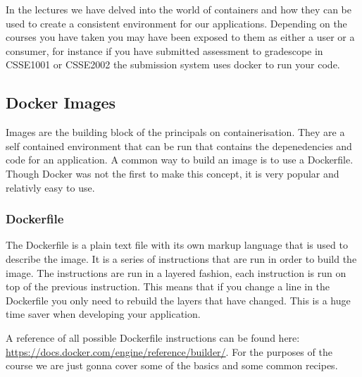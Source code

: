 \documentclass{csse4400}
\begin{document}
In the lectures we have delved into the world of containers and how they can be used to create a consistent environment for our applications. Depending on the courses you have taken you may have been exposed to them as either a user or a consumer, for instance if you have submitted assessment to gradescope in CSSE1001 or CSSE2002 the submission system uses docker to run your code.\\



\subsection{Docker Images}

Images are the building block of the principals on containerisation. They are a self contained environment that can be run that contains the depenedencies and code for an application. A common way to build an image is to use a Dockerfile. Though Docker was not the first to make this concept, it is very popular and relativly easy to use.

\subsubsection{Dockerfile}

The Dockerfile is a plain text file with its own markup language that is used to describe the image. It is a series of instructions that are run in order to build the image. The instructions are run in a layered fashion, each instruction is run on top of the previous instruction. This means that if you change a line in the Dockerfile you only need to rebuild the layers that have changed. This is a huge time saver when developing your application.

A reference of all possible Dockerfile instructions can be found here: \url{https://docs.docker.com/engine/reference/builder/}. For the purposes of the course we are just gonna cover some of the basics and some common recipes.
\end{document}
